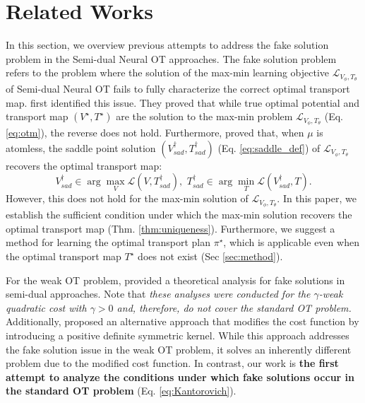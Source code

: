 \section{Related Works} \label{sec:related_works}
In this section, we overview previous attempts to address the fake solution problem in the Semi-dual Neural OT approaches. The fake solution problem refers to the problem where the solution of the max-min learning objective $\mathcal{L}_{V_{\phi}, T_{\theta}}$ of Semi-dual Neural OT fails to fully characterize the correct optimal transport map. \citet{otm, fanscalable} first identified this issue. They proved that while true optimal potential and transport map $(V^{\star}, T^{\star})$ are the solution to the max-min problem $\mathcal{L}_{V_{\phi}, T_{\theta}}$ (Eq. \ref{eq:otm}), the reverse does not hold. Furthermore, \citet{fanTMLR} proved that, when $\mu$ is atomless, the saddle point solution $(V_{sad}^{\dagger}, T_{sad}^{\dagger})$ (Eq. \ref{eq:saddle_def}) of $\mathcal{L}_{V_{\phi}, T_{\theta}}$ recovers the optimal transport map:
\begin{equation} \label{eq:saddle_def}
        V_{sad}^{\dagger} \in \arg\max_{V} \mathcal{L} (V, T_{sad}^{\dagger}), \,\,
        T_{sad}^{\dagger} \in \arg\min_{T} \mathcal{L} (V_{sad}^{\dagger}, T).    
\end{equation} 
However, this does not hold for the max-min solution of $\mathcal{L}_{V_{\phi}, T_{\theta}}$. In this paper, we establish the sufficient condition under which the max-min solution recovers the optimal transport map (Thm. \ref{thm:uniqueness}). Furthermore, we suggest a method for learning the optimal transport plan $\pi^{\star}$, which is applicable even when the optimal transport map $T^{\star}$ does not exist (Sec \ref{sec:method}).

For the weak OT problem, \citet{not, knot} provided a theoretical analysis for fake solutions in semi-dual approaches. Note that \textit{these analyses were conducted for the $\gamma$-weak quadratic cost with $\gamma > 0$ and, therefore, do not cover the standard OT problem.} Additionally, \citet{knot} proposed an alternative approach that modifies the cost function by introducing a positive definite symmetric kernel. While this approach addresses the fake solution issue in the weak OT problem, it solves an inherently different problem due to the modified cost function. 
In contrast, our work is \textbf{the first attempt to analyze the conditions under which fake solutions occur in the standard OT problem} (Eq. \ref{eq:Kantorovich}). 

